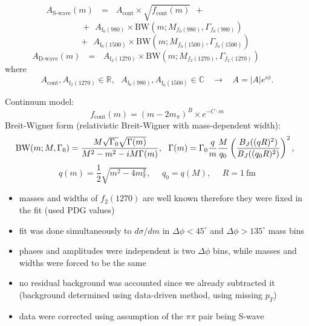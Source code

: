 \[A_{\textrm{S-wave}}(m)~~~=~~~A_{\textrm{cont}}\times\sqrt{f_{\textrm{cont}}(m)}~~+~~~~~~~~~~~~~~~~~~~~~~~~~~~~~~~~~~\]\vspace{-15pt}
\[~~~~~+~~A_{\textrm{f}_0(980)}\times \textrm{BW}\left(m;M_{f_0(980)},\Gamma_{f_0(980)}\right)\]
\[~~~~~~~~+~~A_{\textrm{f}_0(1500)}\times \textrm{BW}\left(m;M_{f_0(1500)},\Gamma_{f_0(1500)}\right)\]\vspace{-10pt}
\[A_{\textrm{D-wave}}(m)~~~=~~~A_{\textrm{f}_2(1270)}\times \textrm{BW}\left(m;M_{f_2(1270)},\Gamma_{f_2(1270)}\right)~~~~~~~~~~~~\]\vspace*{-5pt}
where\vspace{5pt}
\[A_{\textrm{cont}},A_{\textrm{f}_2(1270)}\in\mathbb{R},~~~A_{\textrm{f}_0(980)},A_{\textrm{f}_0(1500)}\in\mathbb{C}~~~~\rightarrow~~~~A=|A|e^{i\phi}.\]

Continuum model:
 \[f_{\textrm{cont}}(m) = (m-2m_{\pi})^{B}\times e^{-C\cdot m}\]
 Breit-Wigner form (relativistic Breit-Wigner with mass-dependent width):\vspace{-5pt}
\[\hspace*{-5pt}\textrm{BW}(m;M,\Gamma_{0}) = \frac{M\sqrt{\Gamma_{0}}\sqrt{\Gamma(m)}}{M^{2}-m^{2}-i M\Gamma(m)},~~\Gamma(m) = \Gamma_{0}\frac{q}{m}\frac{M}{q_{0}}\left(\frac{B_{J}((qR)^{2})}{B_{J}((q_{0}R)^{2})}\right)^{2},\]\vspace*{-7pt}
\[q(m) = \frac{1}{2}\sqrt{m^{2}-4m_{\pi}^{2}},~~~~~~q_{0} = q(M),~~~~~~R=1~\textrm{fm}\]\vspace*{-15pt}
\begin{itemize}
 \item masses and widths of $f_{2}(1270)$ are well known therefore they were fixed in the fit (used PDG values)
 \item fit was done simultaneously to $d\sigma/dm$ in $\Delta\phi<45^{\circ}$ and $\Delta\phi>135^{\circ}$ mass bins
 \item phases and amplitudes were independent is two $\Delta\phi$ bins, while masses and widths were forced to be the same
 \item no residual background was accounted since we already subtracted it (background determined using data-driven method, using missing $p_{T}$)
 \item data were corrected using assumption of the $\pi\pi$ pair being S-wave
\end{itemize}
